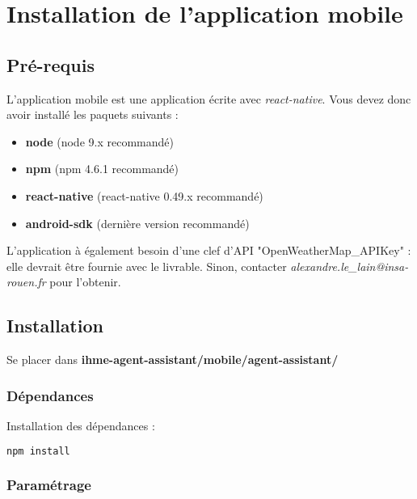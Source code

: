 \chapter{Installation de l'application mobile}

\section{Pré-requis}
L'application mobile est une application écrite avec \emph{react-native}. Vous devez donc avoir installé les paquets suivants :
\begin{itemize}
\item \textbf{node} (node 9.x recommandé)
\item \textbf{npm} (npm 4.6.1 recommandé)
\item \textbf{react-native} (react-native 0.49.x recommandé)
\item \textbf{android-sdk} (dernière version recommandé)\\
\end{itemize}


L'application à également besoin d'une clef d'API "OpenWeatherMap\_APIKey" : elle devrait être fournie avec le livrable. Sinon, contacter \emph{alexandre.le\_lain@insa-rouen.fr} pour l'obtenir.
\section{Installation}

Se placer dans \textbf{ihme-agent-assistant/mobile/agent-assistant/}

\subsection{Dépendances}

Installation des dépendances :
\begin{lstlisting}[language=bash]
  npm install
\end{lstlisting}

\subsection{Paramétrage}

